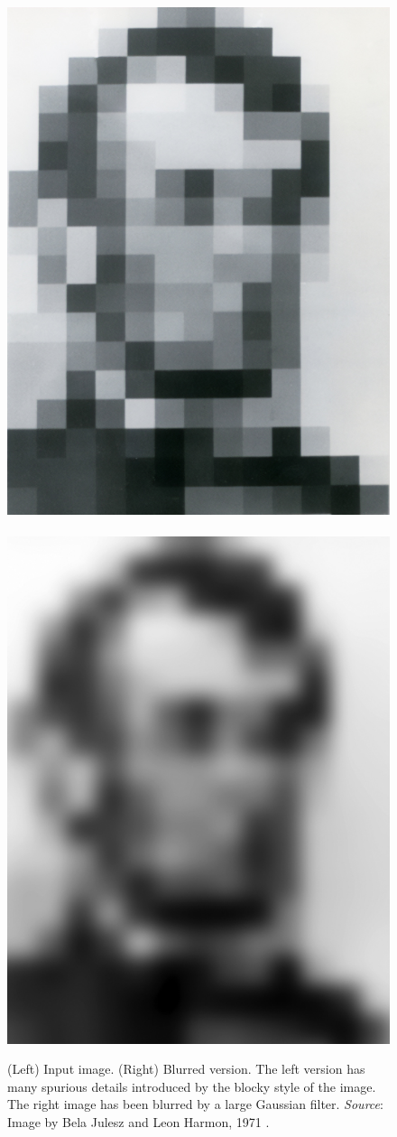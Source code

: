 \begin{figure}[t]
\centerline{
\includegraphics[width=.35\linewidth]{figures/blur_filters/Jules_Lincoln_1971.jpg}
~~
\includegraphics[width=.35\linewidth]{figures/blur_filters/Jules_Lincoln_1971_blur.jpg}
}
\caption{(Left)  Input image.  (Right)  Blurred version.  The left
  version has many spurious details introduced by the blocky style of
  the image.  The right image has been blurred by a large Gaussian
  filter.  
  {\em Source}: Image by Bela Julesz and Leon Harmon, 1971 \cite{Harmon_1973}.
} 
\label{fig:lincoln}
\end{figure}


